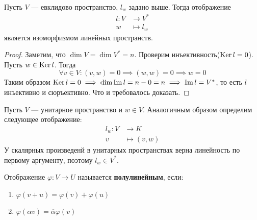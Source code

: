 \documentclass[../main.tex]{subfiles}
\begin{document}
\begin{theorem-non}
\label{non:8.12}
  Пусть $V$ --- евклидово пространство, $l_w$ задано выше. Тогда отображение
  \begin{align*}
    l\colon V &\to V^{*} \\
            w &\mapsto l_w
  \end{align*}
  является изоморфизмом линейных пространств.
\end{theorem-non}
\begin{proof}
  Заметим, что $\dim V = \dim V^{*} = n$. Проверим инъективность($\operatorname{Ker} l = 0$). Пусть $w \in \operatorname{Ker} l$. Тогда
  \begin{equation*}
    \forall v \in V\colon (v, w) = 0 \implies (w, w) = 0 \implies w = 0
  \end{equation*}
  Таким образом $\operatorname{Ker} l = 0 \implies \dim \operatorname{Im} l = n - 0 = n \implies \operatorname{Im} l = V^{*}$, то есть $l$ инъективно и сюръективно. Что и требовалось доказать.
\end{proof}

Пусть $V$ --- унитарное пространство и $w \in V$. Аналогичным образом определим следующее отображение:
\begin{align*}
  l_w\colon V &\to K \\
            v &\mapsto (v, w)
\end{align*}
У скалярных произведенй в унитарных пространствах верна линейность по первому аргументу, поэтому $l_w \in V^{*}$.
\begin{definition}
  Отображение $\varphi\colon V \to U$ называется \textbf{полулинейным}, если:
  \begin{enumerate}
    \item $\varphi(v + u) = \varphi(v) + \varphi(u)$
    \item $\varphi(\alpha v) = \overline{\alpha} \varphi(v)$
  \end{enumerate}
\end{definition}
\end{document}
